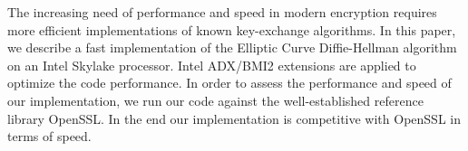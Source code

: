 The increasing need of performance and speed in modern encryption requires more efficient implementations of known key-exchange algorithms. In this paper, we describe a fast implementation of the Elliptic Curve Diffie-Hellman algorithm on an Intel Skylake processor. Intel ADX/BMI2 extensions are applied to optimize the code performance. In order to assess the performance and speed of our implementation, we run our code against the well-established reference library OpenSSL. In the end our implementation is competitive with OpenSSL in terms of speed. 